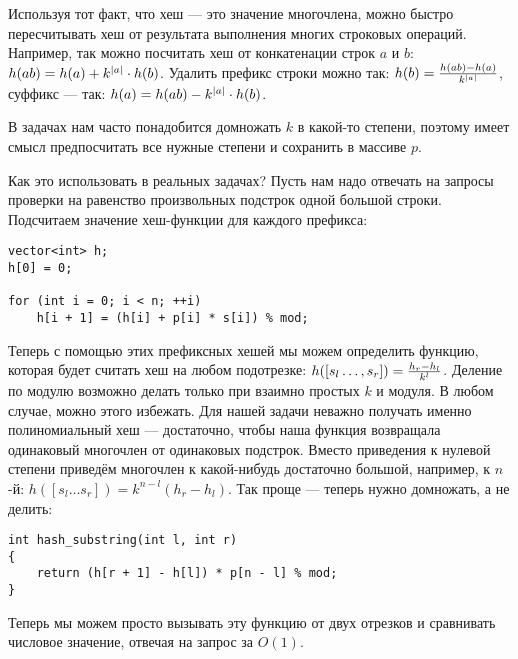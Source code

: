 Используя тот факт, что хеш --- это значение многочлена, можно быстро пересчитывать хеш от результата выполнения многих строковых операций. Например, так можно посчитать хеш от конкатенации строк $a$ и $b$: $h(ab) = h(a) + k^{\left\lvert a\right\rvert} \cdot h(b)$. Удалить префикс строки можно так: $h(b) = \frac{h(ab) - h(a)}{k^{\left\lvert a\right\rvert}}$, суффикс --- так: $h(a) = h(ab) - k^{\left\lvert a\right\rvert} \cdot h(b)$.

В задачах нам часто понадобится домножать $k$ в какой-то степени, поэтому имеет смысл предпосчитать все нужные степени и сохранить в массиве $p$.

Как это использовать в реальных задачах? Пусть нам надо отвечать на запросы проверки на равенство произвольных подстрок одной большой строки. Подсчитаем значение хеш-функции для каждого префикса:

\begin{verbatim}
vector<int> h;
h[0] = 0;

for (int i = 0; i < n; ++i)
    h[i + 1] = (h[i] + p[i] * s[i]) % mod;
\end{verbatim}

Теперь с помощью этих префиксных хешей мы можем определить функцию, которая будет считать хеш на любом подотрезке: $h([s_l\ldots, s_r]) \hm = \frac{h_r - h_l}{k^l}$. Деление по модулю возможно делать только при взаимно простых $k$ и модуля. В любом случае, можно этого избежать. Для нашей задачи неважно получать именно полиномиальный хеш --- достаточно, чтобы наша функция возвращала одинаковый многочлен от одинаковых подстрок. Вместо приведения к нулевой степени приведём многочлен к какой-нибудь достаточно большой, например, к $n$-й: $h([s_l\ldots s_r]) = k^{n - l}(h_r - h_l)$. Так проще --- теперь нужно домножать, а не делить:

\begin{verbatim}
int hash_substring(int l, int r)
{
    return (h[r + 1] - h[l]) * p[n - l] % mod;
}
\end{verbatim}

Теперь мы можем просто вызывать эту функцию от двух отрезков и сравнивать числовое значение, отвечая на запрос за $O(1)$.

